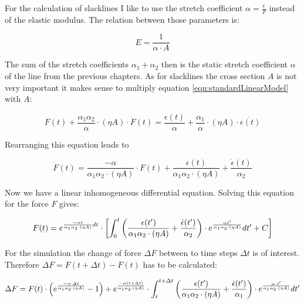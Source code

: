 For the calculation of slacklines I like to use the stretch coefficient $\alpha = \frac{\epsilon}{F}$ instead of the elastic modulus. The relation between those parameters is:

\begin{equation}
	E = \frac{1}{\alpha\cdot A}
\end{equation}

The sum of the stretch coefficients $\alpha_1+\alpha_2$ then is the static stretch coefficient $\alpha$ of the line from the previous chapters. As for slacklines the cross section $A$ is not very important it makes sense to multiply equation \ref{eqn:standardLinearModel} with $A$:

\begin{equation}
F(t) + \frac{\alpha_1\alpha_2}{\alpha}\cdot (\eta A)\cdot\dot F(t) = \frac{\epsilon(t)}{\alpha} + \frac{\alpha_1}{\alpha}\cdot (\eta A)\cdot\dot{\epsilon(t)}
\end{equation}

Rearranging this equation leads to

\begin{equation}
	\dot F(t) = \frac{-\alpha}{\alpha_1\alpha_2\cdot (\eta A)} \cdot F(t) + \frac{\epsilon (t)}{\alpha_1\alpha_2\cdot(\eta A)} + \frac{\dot{\epsilon} (t)}{\alpha_2}
\end{equation}

Now we have a linear inhomogeneous differential equation. Solving this equation for the force $F$ gives:

\begin{equation}
\begin{split}
	F(t) \insertForSmartphone{&}= e^{ \frac{-\alpha t}{\alpha_1\alpha_2\cdot (\eta A)} dt } \cdot \insertForSmartphone{\\ &}\left[ \int_0^t \left( \frac{\epsilon (t')}{\alpha_1\alpha_2\cdot (\eta A)} + \frac{\dot{\epsilon}   (t')}{\alpha_2} \right) \cdot e^{\frac{\alpha t'}{\alpha_1\alpha_2\cdot (\eta A)}} dt' + C \right]
\end{split}
\end{equation}

For the simulation the change of force $\Delta F$ between to time steps $\Delta t$ is of interest. Therefore $\Delta F = F(t+\Delta t) - F(t)$ has to be calculated:

\begin{equation}
\begin{split}
	\Delta F = F(t)\cdot \left( e^{\frac{-\alpha\cdot \Delta t}{\alpha_1\alpha_2\cdot(\eta A)}} - 1 \right) + e^{\frac{-\alpha(t+\Delta t)}{\alpha_1\alpha_2\cdot (\eta A)}} \cdot \insertForSmartphone{\\} \int_t^{t+\Delta t} \left( \frac{\epsilon (t')}{\alpha_1\alpha_2\cdot(\eta A)} + \frac{\dot{ \epsilon} (t')}{\alpha_1} \right) \cdot e^{\frac{\alpha\cdot t'}{\alpha_1\alpha_2\cdot (\eta A)}} dt'
\end{split}
\end{equation}

